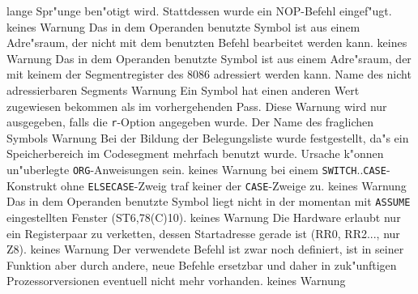 \documentclass[12pt,a4paper,twoside]{report}
\newcommand{\tty}[1]{{\tt #1}}
\begin{document}
\begin{description}
{                lange Spr"unge ben"otigt wird.  Stattdessen wurde ein
                NOP-Befehl eingef"ugt.}
               {keines}
               {Warnung}
               {Das in dem Operanden benutzte Symbol
                ist aus einem Adre"sraum, der nicht mit dem benutzten
                Befehl bearbeitet werden kann.}
               {keines}
               {Warnung}
               {Das in dem Operanden benutzte Symbol
                ist aus einem Adre"sraum, der mit keinem der Segmentregister
                des 8086 adressiert werden kann.}
               {Name des nicht adressierbaren Segments}
               {Warnung}
               {Ein Symbol hat einen anderen Wert zugewiesen
                bekommen als im vorhergehenden Pass.  Diese Warnung wird
                nur ausgegeben, falls die \tty{r}-Option angegeben wurde.}
               {Der Name des fraglichen Symbols}
               {Warnung}
               {Bei der Bildung der Belegungsliste wurde
                festgestellt, da"s ein Speicherbereich im Codesegment
                mehrfach benutzt wurde.  Ursache k"onnen un"uberlegte
                \tty{ORG}-Anweisungen sein.}
               {keines}
               {Warnung}
               {bei einem \tty{SWITCH}..\tty{CASE}-Konstrukt ohne
                \tty{ELSECASE}-Zweig traf keiner der \tty{CASE}-Zweige zu.}
               {keines}
               {Warnung}
               {Das in dem Operanden benutzte Symbol
                liegt nicht in der momentan mit \tty{ASSUME} eingestellten
                Fenster (ST6,78(C)10).}
               {keines}
               {Warnung}
               {Die Hardware erlaubt nur ein Registerpaar
                zu verketten, dessen Startadresse gerade ist (RR0, RR2...,
                nur Z8).}
               {keines}
               {Warnung}
               {Der verwendete Befehl ist zwar noch
                definiert, ist in seiner Funktion aber durch andere,
                neue Befehle ersetzbar und daher in zuk"unftigen
                Prozessorversionen eventuell nicht mehr vorhanden.}
               {keines}
               {Warnung}

\end{description}
\end{document}
